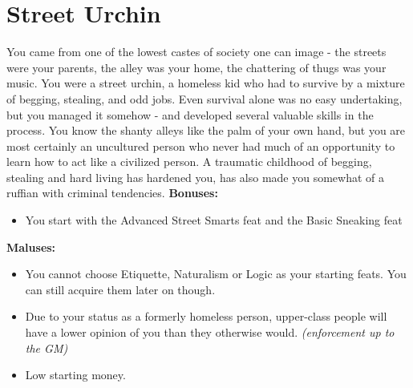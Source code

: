 \section{Street Urchin}
You came from one of the lowest castes of society one can image - the streets were your parents, the alley was your home, the chattering of thugs was your music. You were a street urchin, a homeless kid who had to survive by a mixture of begging, stealing, and odd jobs. Even survival alone was no easy undertaking, but you managed it somehow - and developed several valuable skills in the process. You know the shanty alleys like the palm of your own hand, but you are most certainly an uncultured person who never had much of an opportunity to learn how to act like a civilized person. A traumatic childhood of begging, stealing and hard living has hardened you, has also made you somewhat of a ruffian with criminal tendencies.\newline
\textbf{Bonuses:}
\begin{itemize}
	\item You start with the Advanced Street Smarts feat and the Basic Sneaking feat
\end{itemize}
\textbf{Maluses:}
\begin{itemize}
	\item You cannot choose Etiquette, Naturalism or Logic as your starting feats. You can still acquire them later on though.
	\item Due to your status as a formerly homeless person, upper-class people will have a lower opinion of you than they otherwise would. \textit{(enforcement up to the GM)}
	\item Low starting money.
\end{itemize}
